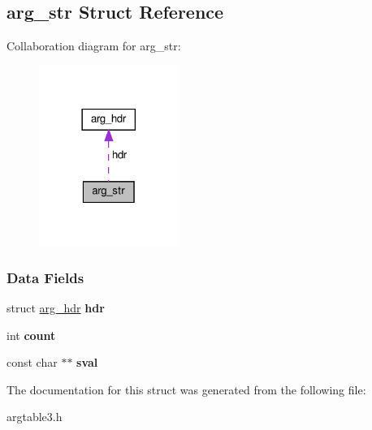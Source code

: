 \hypertarget{structarg__str}{}\subsection{arg\+\_\+str Struct Reference}
\label{structarg__str}


Collaboration diagram for arg\+\_\+str\+:\nopagebreak
\begin{figure}[H]
\begin{center}
\leavevmode
\includegraphics[width=129pt]{structarg__str__coll__graph}
\end{center}
\end{figure}
\subsubsection*{Data Fields}
\begin{DoxyCompactItemize}
\item 
\mbox{\label{structarg__str_ac4547101ac4ec560e101979423be8289}} 
struct \hyperlink{structarg__hdr}{arg\+\_\+hdr} {\bfseries hdr}
\item 
\mbox{\label{structarg__str_aaa99fd17e707232cb78e96fafb003d4f}} 
int {\bfseries count}
\item 
\mbox{\label{structarg__str_ad41813dbbf8d8666a45bf071437ca61d}} 
const char $\ast$$\ast$ {\bfseries sval}
\end{DoxyCompactItemize}


The documentation for this struct was generated from the following file\+:\begin{DoxyCompactItemize}
\item 
argtable3.\+h\end{DoxyCompactItemize}
